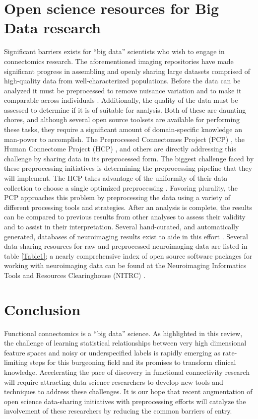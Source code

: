 \documentclass{bmcart}
\begin{document}
\section{Open science resources for Big Data research}

Significant barriers exists for ``big data'' scientists who wish to engage in connectomics research. The aforementioned imaging repositories have made significant progress in assembling and openly sharing large datasets comprised of high-quality data from well-characterized populations. Before the data can be analyzed it must be preprocessed to remove nuisance variation and to make it comparable across individuals \cite{strother2006}. Additionally, the quality of the data must be assessed to determine if it is of suitable for analysis. Both of these are daunting chores, and although several open source toolsets are available for performing these tasks, they require a significant amount of domain-specific knowledge an man-power to accomplish. The Preprocessed Connectomes Project (PCP) \cite{CraddockPCP}, the Human Connectome Project (HCP) \cite{RosenHCP2010,VanEssen2012}, and others are directly addressing this challenge by sharing data in its preprocessed form. The biggest challenge faced by these preprocessing initiatives is determining the preprocessing pipeline that they will implement. The HCP takes advantage of the uniformity of their data collection to choose a single optimized preprocessing \cite{Glasser2013}. Favoring plurality, the PCP approaches this problem by preprocessing the data using a variety of different processing tools and strategies. After an analysis is complete, the results can be compared to previous results from other analyses to assess their validity and to assist in their interpretation. Several hand-curated, and automatically generated, databases of neuroimaging results exist to aide in this effort \cite{Fox2002, Yarkoni2011, Neurovault, Brainspell}. Several data-sharing resources for raw and preprocessed neuroimaging data are listed in table \ref{Table1}; a nearly comprehensive index of open source software packages for working with neuroimaging data can be found at the Neuroimaging Informatics Tools and Resources Clearinghouse (NITRC) \cite{NITRC}. 


\section {Conclusion}
Functional connectomics is a ``big data'' science. As highlighted in this review, the challenge of learning statistical relationships between very high dimensional feature spaces and noisy or underspecified labels is rapidly emerging as rate-limiting steps for this burgeoning field and its promises to transform clinical knowledge. Accelerating the pace of discovery in functional connectivity research will require attracting data science researchers to develop new tools and techniques to address these challenges. It is our hope that recent augmentation of open science data-sharing initiatives with preprocessing efforts will catalyze the involvement of these researchers by reducing the common barriers of entry. 
\end{document}
